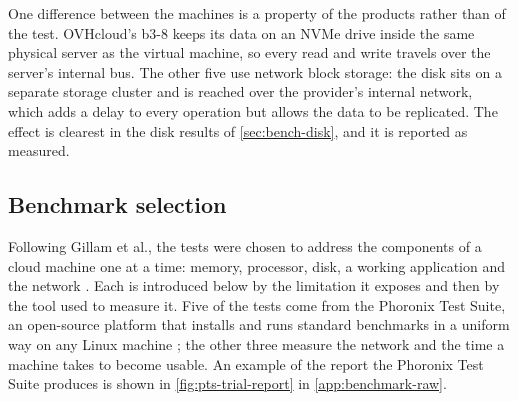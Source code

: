 One difference between the machines is a property of the products rather than
of the test. OVHcloud's b3-8 keeps its data on an NVMe drive inside the same
physical server as the virtual machine, so every read and write travels over the
server's internal bus. The other five use network block storage: the disk sits on
a separate storage cluster and is reached over the provider's internal network,
which adds a delay to every operation but allows the data to be replicated. The
effect is clearest in the disk results of \cref{sec:bench-disk}, and it is
reported as measured.


\subsection{Benchmark selection}

Following Gillam et al., the tests were chosen to address the components of a
cloud machine one at a time: memory, processor, disk, a working application and
the network \cite{Gillam_FairBenchmarking_2013}. Each is introduced below by the
limitation it exposes and then by the tool used to measure it. Five of the tests
come from the Phoronix Test Suite, an open-source platform that installs and runs
standard benchmarks in a uniform way on any Linux machine
\cite{PhoronixTestSuite}; the other three measure the network and the time a
machine takes to become usable. An example of the report the Phoronix Test Suite
produces is shown in \cref{fig:pts-trial-report} in \cref{app:benchmark-raw}.

